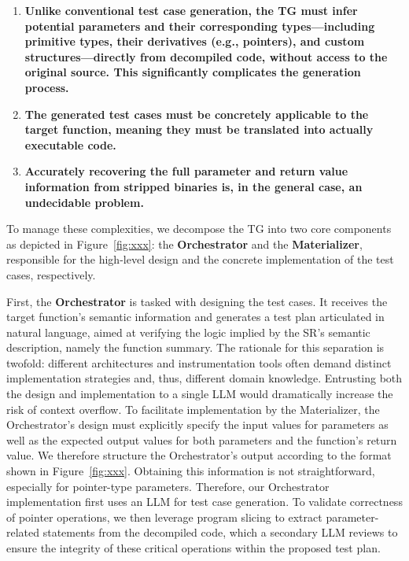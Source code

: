 \documentclass[acmsmall,screen,review,anonymous]{acmart} %
\begin{document}
\begin{enumerate}
    \item \textbf{Unlike conventional test case generation, the TG must infer potential parameters and their corresponding types---including primitive types, their derivatives (e.g., pointers), and custom structures---directly from decompiled code, without access to the original source. This significantly complicates the generation process.}
    \item \textbf{The generated test cases must be concretely applicable to the target function, meaning they must be translated into actually executable code.}
    \item \textbf{Accurately recovering the full parameter and return value information from stripped binaries is, in the general case, an undecidable problem.}
\end{enumerate}

To manage these complexities, we decompose the TG into two core components as depicted in Figure~\ref{fig:xxx}: the \textbf{Orchestrator} and the \textbf{Materializer}, responsible for the high-level design and the concrete implementation of the test cases, respectively.

First, the \textbf{Orchestrator} is tasked with designing the test cases.  It receives the target function's semantic information and generates a test plan articulated in natural language, aimed at verifying the logic implied by the SR's semantic description, namely the function summary. The rationale for this separation is twofold: different architectures and instrumentation tools often demand distinct implementation strategies and, thus, different domain knowledge. Entrusting both the design and implementation to a single LLM would dramatically increase the risk of context overflow. To facilitate implementation by the Materializer, the Orchestrator's design must explicitly specify the input values for parameters as well as the expected output values for both parameters and the function's return value. We therefore structure the Orchestrator's output according to the format shown in Figure~\ref{fig:xxx}. Obtaining this information is not straightforward, especially for pointer-type parameters. Therefore, our Orchestrator implementation first uses an LLM for test case generation. To validate  correctness of pointer operations, we then leverage program slicing to extract parameter-related statements from the decompiled code, which a secondary LLM reviews to ensure the integrity of these critical operations within the proposed test plan.
\end{document}
